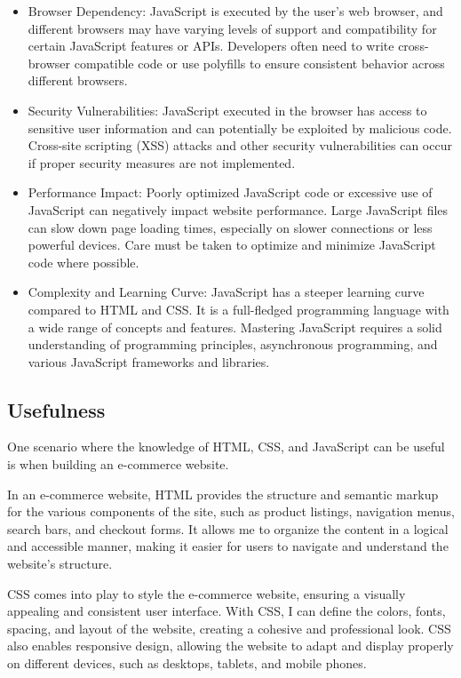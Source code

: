 \documentclass[a4paper, 11pt]{report}
\begin{document}
\begin{itemize}
\item	Browser Dependency: JavaScript is executed by the user's web browser, and different browsers may have varying levels of support and compatibility for certain JavaScript features or APIs. Developers often need to write cross-browser compatible code or use polyfills to ensure consistent behavior across different browsers.
\item	Security Vulnerabilities: JavaScript executed in the browser has access to sensitive user information and can potentially be exploited by malicious code. Cross-site scripting (XSS) attacks and other security vulnerabilities can occur if proper security measures are not implemented.
\item	Performance Impact: Poorly optimized JavaScript code or excessive use of JavaScript can negatively impact website performance. Large JavaScript files can slow down page loading times, especially on slower connections or less powerful devices. Care must be taken to optimize and minimize JavaScript code where possible.
\item	Complexity and Learning Curve: JavaScript has a steeper learning curve compared to HTML and CSS. It is a full-fledged programming language with a wide range of concepts and features. Mastering JavaScript requires a solid understanding of programming principles, asynchronous programming, and various JavaScript frameworks and libraries.
\end{itemize}

\subsection{Usefulness}
One scenario where the knowledge of HTML, CSS, and JavaScript can be useful is when building an e-commerce website.


In an e-commerce website, HTML provides the structure and semantic markup for the various components of the site, such as product listings, navigation menus, search bars, and checkout forms. It allows me to organize the content in a logical and accessible manner, making it easier for users to navigate and understand the website's structure.

CSS comes into play to style the e-commerce website, ensuring a visually appealing and consistent user interface. With CSS, I can define the colors, fonts, spacing, and layout of the website, creating a cohesive and professional look. CSS also enables responsive design, allowing the website to adapt and display properly on different devices, such as desktops, tablets, and mobile phones.
\end{document}
